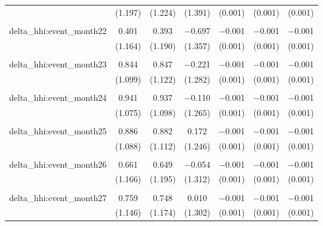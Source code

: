 \begin{table}[H]
{\begin{tabular}{@{\extracolsep{5pt}}lcccccc}
   & (1.197) & (1.224) & (1.391) & (0.001) & (0.001) & (0.001) \\  

   & & & & & & \\  

  delta\_hhi:event\_month22 & 0.401 & 0.393 & $-$0.697 & $-$0.001 & $-$0.001 & $-$0.001 \\  

   & (1.164) & (1.190) & (1.357) & (0.001) & (0.001) & (0.001) \\  

   & & & & & & \\  

  delta\_hhi:event\_month23 & 0.844 & 0.847 & $-$0.221 & $-$0.001 & $-$0.001 & $-$0.001 \\  

   & (1.099) & (1.122) & (1.282) & (0.001) & (0.001) & (0.001) \\  

   & & & & & & \\  

  delta\_hhi:event\_month24 & 0.941 & 0.937 & $-$0.110 & $-$0.001 & $-$0.001 & $-$0.001 \\  

   & (1.075) & (1.098) & (1.265) & (0.001) & (0.001) & (0.001) \\  

   & & & & & & \\  

  delta\_hhi:event\_month25 & 0.886 & 0.882 & 0.172 & $-$0.001 & $-$0.001 & $-$0.001 \\  

   & (1.088) & (1.112) & (1.246) & (0.001) & (0.001) & (0.001) \\  

   & & & & & & \\  

  delta\_hhi:event\_month26 & 0.661 & 0.649 & $-$0.054 & $-$0.001 & $-$0.001 & $-$0.001 \\  

   & (1.166) & (1.195) & (1.312) & (0.001) & (0.001) & (0.001) \\  

   & & & & & & \\  

  delta\_hhi:event\_month27 & 0.759 & 0.748 & 0.010 & $-$0.001 & $-$0.001 & $-$0.001 \\  

   & (1.146) & (1.174) & (1.302) & (0.001) & (0.001) & (0.001) \\  


\end{tabular}}
\end{table}
